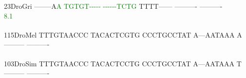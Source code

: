 \documentclass[11pt,twoside,reqno,a4paper]{article}
\begin{document}
{23\hspace*{3\charwidth}DroGri	--------A\textcolor{green}{A}	\textcolor{green}{T}\textcolor{green}{G}\textcolor{green}{T}\textcolor{green}{G}\textcolor{green}{T}\textcolor{green}{-}\textcolor{green}{-}\textcolor{green}{-}\textcolor{green}{-}\textcolor{green}{-}	\textcolor{green}{-}\textcolor{green}{-}\textcolor{green}{-}\textcolor{green}{-}\textcolor{green}{-}\textcolor{green}{-}\textcolor{green}{T}\textcolor{green}{C}\textcolor{green}{T}\textcolor{green}{G}	TTTT------	----------	----------	\\
\hspace*{5\charwidth}\hspace*{7\charwidth}\hspace*{9\charwidth}\textcolor{green}{8.1}\hspace*{1\charwidth}\hspace*{1\charwidth}\hspace*{1\charwidth}\hspace*{1\charwidth}\hspace*{1\charwidth}\hspace*{1\charwidth}\\
\\
115\hspace*{2\charwidth}DroMel	TTTGTAACCC	TACACTCGTG	CCCTGCCTAT	A---AATAAA	A---------	----------	\\
\hspace*{5\charwidth}\hspace*{7\charwidth}\hspace*{1\charwidth}\hspace*{1\charwidth}\hspace*{1\charwidth}\hspace*{1\charwidth}\hspace*{1\charwidth}\hspace*{1\charwidth}\\
103\hspace*{2\charwidth}DroSim	TTTGTAACCC	TACACTCCTG	CCCTGCCTAT	A---AATAAA	T---------	----------	\\
\hspace*{5\charwidth}\hspace*{7\charwidth}\hspace*{1\charwidth}\hspace*{1\charwidth}\hspace*{1\charwidth}\hspace*{1\charwidth}\hspace*{1\charwidth}\hspace*{1\charwidth}\\
}
\end{document}
